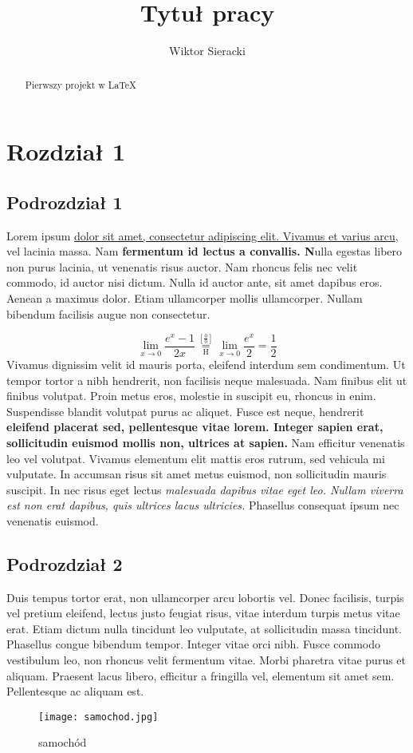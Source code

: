 \documentclass[12pt,a4paper]{article}
\title{Tytuł pracy}
\author{Wiktor Sieracki}
\begin{document}
	\maketitle
	
	\begin{abstract}
		Pierwszy projekt w \LaTeX  
	\end{abstract}
	
	
	\tableofcontents
	\listoftables
	\listoffigures
	
	\newpage
	
	\section{Rozdział 1}
	\subsection{Podrozdział 1}
	 Lorem ipsum \underline{dolor sit amet, consectetur adipiscing elit. Vivamus et varius arcu}, vel lacinia massa. Nam\textbf{ fermentum id lectus a convallis. N}ulla egestas libero non purus lacinia, ut venenatis risus auctor. Nam rhoncus felis nec velit commodo, id auctor nisi dictum. Nulla id auctor ante, sit amet dapibus eros. Aenean a maximus dolor. Etiam ullamcorper mollis ullamcorper. Nullam bibendum facilisis augue non consectetur.

  
	\[
 \lim_{x\to 0}{\frac{e^x-1}{2x}}
 \overset{\left[\frac{0}{0}\right]}{\underset{\mathrm{H}}{=}}
 \lim_{x\to 0}{\frac{e^x}{2}}={\frac{1}{2}}
\]
\label{wzor 1}
Vivamus dignissim velit id mauris porta, eleifend interdum sem condimentum. Ut tempor tortor a nibh hendrerit, non facilisis neque malesuada. Nam finibus elit ut finibus volutpat. Proin metus eros, molestie in suscipit eu, rhoncus in enim. Suspendisse blandit volutpat purus ac aliquet. Fusce est neque, hendrerit \textbf{eleifend placerat sed, pellentesque vitae lorem. Integer sapien erat, sollicitudin euismod mollis non, ultrices at sapien.} Nam efficitur venenatis leo vel volutpat. Vivamus elementum elit mattis eros rutrum, sed vehicula mi vulputate. In accumsan risus sit amet metus euismod, non sollicitudin mauris suscipit. In nec risus eget lectus \textit{malesuada dapibus vitae eget leo. Nullam viverra est non erat dapibus, quis ultrices lacus ultricies.} Phasellus consequat ipsum nec venenatis euismod.


	\subsection{Podrozdział 2}
	Duis tempus tortor erat, non ullamcorper arcu lobortis vel. Donec facilisis, turpis vel pretium eleifend, lectus justo feugiat risus, vitae interdum turpis metus vitae erat. Etiam dictum nulla tincidunt leo vulputate, at sollicitudin massa tincidunt. Phasellus congue bibendum tempor. Integer vitae orci nibh. Fusce commodo vestibulum leo, non rhoncus velit fermentum vitae. Morbi pharetra vitae purus et aliquam. Praesent lacus libero, efficitur a fringilla vel, elementum sit amet sem. Pellentesque ac aliquam est.
	\begin{figure}[H]
		\centering
		\texttt{[image: samochod.jpg]}
		\caption{samochód }
	\end{figure}
 \label{samochod}
	
\end{document}
